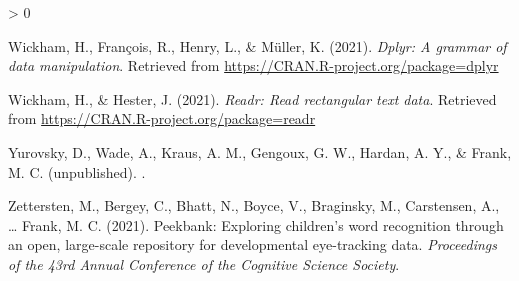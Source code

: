 \documentclass[
  english,
  man,floatsintext]{apa6}
\newlength{\cslhangindent}
\newenvironment{CSLReferences}[2] %
 {%
  \setlength{\parindent}{0pt}
  \ifodd #1 \everypar{\setlength{\hangindent}{\cslhangindent}}\ignorespaces\fi
  \ifnum #2 > 0
  \setlength{\parskip}{#2\baselineskip}
  \fi
 }%
 {}
\providecommand{\DIFaddtex}[1]{{\protect\color{blue}{#1}}} %
\providecommand{\DIFdeltex}[1]{}                      %
\providecommand{\DIFaddbegin}{} %
\providecommand{\DIFaddend}{} %
\providecommand{\DIFdelbegin}{} %
\providecommand{\DIFdelend}{} %
\providecommand{\DIFadd}[1]{\texorpdfstring{\DIFaddtex{#1}}{#1}} %
\providecommand{\DIFdel}[1]{\texorpdfstring{\DIFdeltex{#1}}{}} %
\newcommand{\DIFscaledelfig}{0.5}
\newlength{\DIFdelgraphicswidth} %
\newlength{\DIFdelgraphicsheight} %
\newcommand{\DIFaddincludegraphics}[2][]{{\color{blue}\fbox{\DIFOincludegraphics[#1]{#2}}}} %
\newcommand{\DIFdelincludegraphics}[2][]{%
\sbox{\DIFdelgraphicsbox}{\DIFOincludegraphics[#1]{#2}}%
\settoboxwidth{\DIFdelgraphicswidth}{\DIFdelgraphicsbox} %
\settoboxtotalheight{\DIFdelgraphicsheight}{\DIFdelgraphicsbox} %
\scalebox{\DIFscaledelfig}{%
\parbox[b]{\DIFdelgraphicswidth}{\usebox{\DIFdelgraphicsbox}\\[-\baselineskip] \rule{\DIFdelgraphicswidth}{0em}}\llap{\resizebox{\DIFdelgraphicswidth}{\DIFdelgraphicsheight}{%
\setlength{\unitlength}{\DIFdelgraphicswidth}%
\begin{picture}(1,1)%
\thicklines\linethickness{2pt} %
{\color[rgb]{1,0,0}\put(0,0){\framebox(1,1){}}}%
{\color[rgb]{1,0,0}\put(0,0){\line( 1,1){1}}}%
{\color[rgb]{1,0,0}\put(0,1){\line(1,-1){1}}}%
\end{picture}%
}\hspace*{3pt}}} %
} %
\DeclareRobustCommand{\DIFaddbegin}{\DIFOaddbegin \let\includegraphics\DIFaddincludegraphics} %
\DeclareRobustCommand{\DIFaddend}{\DIFOaddend \let\includegraphics\DIFOincludegraphics} %
\DeclareRobustCommand{\DIFdelbegin}{\DIFOdelbegin \let\includegraphics\DIFdelincludegraphics} %
\DeclareRobustCommand{\DIFdelend}{\DIFOaddend \let\includegraphics\DIFOincludegraphics} %
\begin{document}
\begin{CSLReferences}{1}{0}
\leavevmode\hypertarget{ref-R-dplyr}{}%
Wickham, H., François, R., Henry, L., \& Müller, K. (2021). \emph{Dplyr: A grammar of data manipulation}. Retrieved from \url{https://CRAN.R-project.org/package=dplyr}

\leavevmode\hypertarget{ref-R-readr}{}%
Wickham, H., \& Hester, J. (2021). \emph{Readr: Read rectangular text data}. Retrieved from \url{https://CRAN.R-project.org/package=readr}

\leavevmode\hypertarget{ref-YurovskyWadeKrausUnpub}{}%
Yurovsky, D., Wade, A., Kraus, A. M., Gengoux, G. W., Hardan, A. Y., \& Frank, M. C. (unpublished). \DIFdelbegin \emph{%
\DIFdel{Developmental changes in the speed of social attention in early word learning}%
}%
\DIFdelend \DIFaddbegin {\DIFadd{Developmental changes in the speed of social attention in early word learning}}\DIFaddend .

\leavevmode\hypertarget{ref-zettersten2021}{}%
Zettersten, M., Bergey, C., Bhatt, N., Boyce, V., Braginsky, M., Carstensen, A., \ldots{} Frank, M. C. (2021). Peekbank: Exploring children's word recognition through an open, large-scale repository for developmental eye-tracking data. \emph{Proceedings of the 43rd Annual Conference of the Cognitive Science Society}.

\end{CSLReferences}

\endgroup
\end{document}
